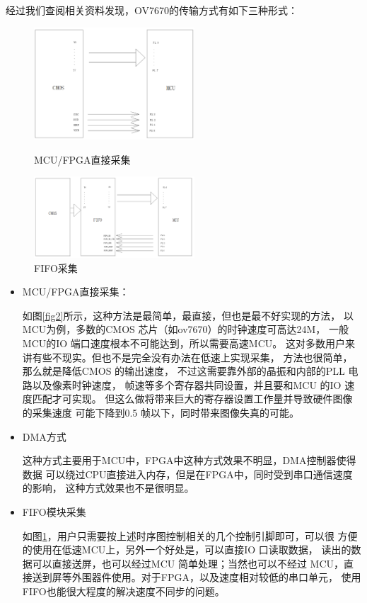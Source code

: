 \documentclass[a4paper]{paper}
\begin{document}
经过我们查阅相关资料发现，OV7670的传输方式有如下三种形式：
\begin{figure}
        \centering
        \includegraphics[width=60mm]{NFIFO.png}
        \caption{MCU/FPGA直接采集}
        \label{fig2}
        \includegraphics[width=60mm]{FIFO.png}
        \caption{FIFO采集}
        \label{fig3}
\end{figure}
\begin{itemize}
    \item MCU/FPGA直接采集：

    如图\ref{fig2}所示，这种方法是最简单，最直接，但也是最不好实现的方法，
    以MCU为例，多数的CMOS 芯片（如ov7670）的时钟速度可高达24M，
    一般MCU的IO 端口速度根本不可能达到，所以需要高速MCU。
    这对多数用户来讲有些不现实。但也不是完全没有办法在低速上实现采集，
    方法也很简单，那么就是降低CMOS 的输出速度，
    不过这需要靠外部的晶振和内部的PLL 电路以及像素时钟速度，
    帧速等多个寄存器共同设置，并且要和MCU 的IO 速度匹配才可实现。
    但这么做将带来巨大的寄存器设置工作量并导致硬件图像的采集速度
    可能下降到0.5 帧以下，同时带来图像失真的可能。
\end{itemize} 

\begin{itemize}
    \item DMA方式

    这种方式主要用于MCU中，FPGA中这种方式效果不明显，DMA控制器使得数据
    可以绕过CPU直接进入内存，但是在FPGA中，同时受到串口通信速度的影响，
    这种方式效果也不是很明显。

    \item FIFO模块采集

    如图\ref{fig3}，用户只需要按上述时序图控制相关的几个控制引脚即可，可以很
    方便的使用在低速MCU上，另外一个好处是，可以直接IO 口读取数据，
    读出的数据可以直接送屏，也可以经过MCU 简单处理；当然也可以不经过
    MCU，直接送到屏等外围器件使用。对于FPGA，以及速度相对较低的串口单元，
    使用FIFO也能很大程度的解决速度不同步的问题。

\end{itemize}
\end{document}
